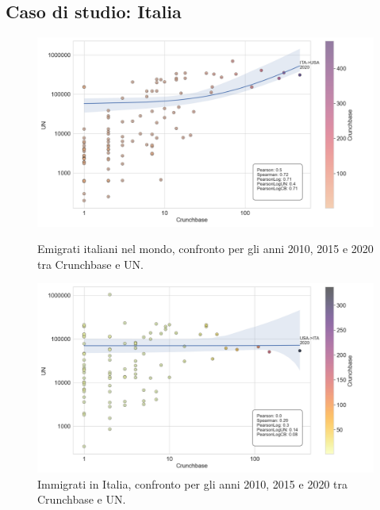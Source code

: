 \subsection{Caso di studio: Italia}
\label{itastock}
\begin{figure}[tbp]
  \centering
  \begin{minipage}[t]{0.8\textwidth}
    \includegraphics[width=\textwidth]{images/Migration_Stocks/ITA/Migration Stocks from ITA.png}
    \caption{Emigrati italiani nel mondo, confronto per gli anni 2010, 2015 e 2020 tra Crunchbase e UN.}
    \label{fig:MigrationstockswithItalianNationality}
  \end{minipage}
  \begin{minipage}[b]{0.8\textwidth}
    \includegraphics[width=\textwidth]{images/Migration_Stocks/ITA/Migration Stocks to ITA.png}
    \caption{Immigrati in Italia, confronto per gli anni 2010, 2015 e 2020 tra Crunchbase e UN. }
    \label{fig:MigrationstocktoItaly}
  \end{minipage}
\end{figure}

